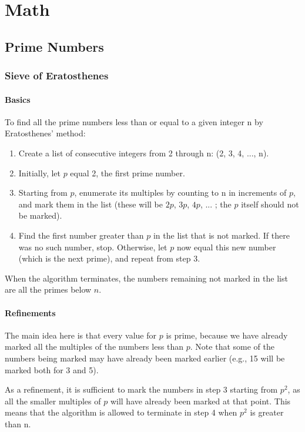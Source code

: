 \chapter{Math}


\section{Prime Numbers}
\subsection{Sieve of Eratosthenes}
\subsubsection{Basics}
To find all the prime numbers less than or equal to a given integer n by Eratosthenes' method:
\begin{enumerate}
\item Create a list of consecutive integers from 2 through n: (2, 3, 4, ..., n).
\item Initially, let $p$ equal 2, the first prime number.
\item Starting from $p$, enumerate its multiples by counting to n in increments of $p$, and mark them in the list (these will be $2p$, $3p$, $4p$, ... ; the $p$ itself should not be marked).
\item Find the first number greater than $p$ in the list that is not marked. If there was no such number, stop. Otherwise, let $p$ now equal this new number (which is the next prime), and repeat from step 3.
\end{enumerate}

When the algorithm terminates, the numbers remaining not marked in the list are all the primes below $n$.

\subsubsection{Refinements}
The main idea here is that every value for $p$ is prime, because we have already marked all the multiples of the numbers less than $p$. Note that some of the numbers being marked may have already been marked earlier (e.g., 15 will be marked both for 3 and 5).

As a refinement, it is sufficient to mark the numbers in step 3 starting from $p^2$, as all the smaller multiples of $p$ will have already been marked at that point. This means that the algorithm is allowed to terminate in step 4 when $p^2$ is greater than n.

